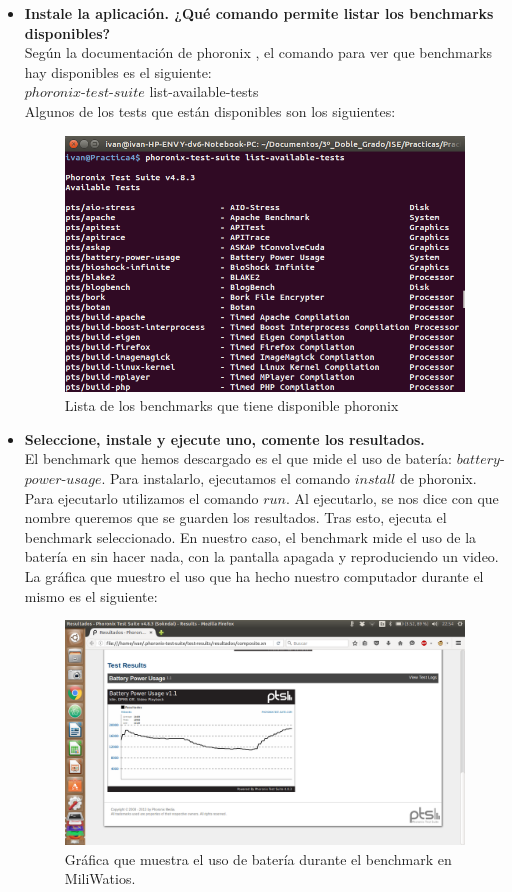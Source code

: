 \begin{itemize}
	\item \textbf{Instale la aplicación. ¿Qué comando permite listar los benchmarks disponibles?}\\
	Según la documentación de phoronix \cite{phoronix}, el comando para ver que benchmarks hay disponibles es el siguiente:\\
	$phoronix$-$test$-$suite$ list-available-tests\\
	Algunos de los tests que están disponibles son los siguientes:\\
	\begin{figure}[H]
		\centering
		\includegraphics[width=0.7\linewidth]{phoronix-tests}
		\caption[phoronix-tests]{Lista de los benchmarks que tiene disponible phoronix}
		\label{fig:phoronix-tests}
	\end{figure}
	
	\item \textbf{Seleccione, instale y ejecute uno, comente los resultados.}\\
	El benchmark que hemos descargado es el que mide el uso de batería: $battery$-$power$-$usage$. Para instalarlo, ejecutamos el comando $install$ de phoronix. Para ejecutarlo utilizamos el comando $run$. Al ejecutarlo, se nos dice con que nombre queremos que se guarden los resultados. Tras esto, ejecuta el benchmark seleccionado. En nuestro caso, el benchmark mide el uso de la batería en sin hacer nada, con la pantalla apagada y reproduciendo un video. La gráfica que muestro el uso que ha hecho nuestro computador durante el mismo es el siguiente:\\
	\begin{figure}[H]
		\centering
		\includegraphics[width=0.7\linewidth]{Grafico_resultados_phorenix}
		\caption[Grafico benchmark]{Gráfica que muestra el uso de batería durante el benchmark en MiliWatios.}
		\label{fig:Grafico_resultados_phorenix}
	\end{figure}


\end{itemize}


